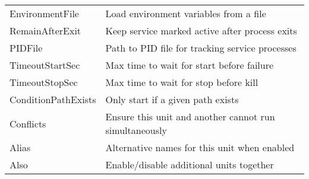 \documentclass[openany, 12pt]{book}
\begin{document}
\begin{center}
\begin{tabular}{ll}
    EnvironmentFile     & Load environment variables from a file                  \\
    RemainAfterExit     & Keep service marked active after process exits          \\
    PIDFile             & Path to PID file for tracking service processes         \\
    TimeoutStartSec     & Max time to wait for start before failure               \\
    TimeoutStopSec      & Max time to wait for stop before kill                   \\
    ConditionPathExists & Only start if a given path exists                       \\
    Conflicts           & Ensure this unit and another cannot run simultaneously  \\
    Alias               & Alternative names for this unit when enabled            \\
    Also                & Enable/disable additional units together                \\
    \bottomrule
  \end{tabular}
\end{center}
\end{document}
